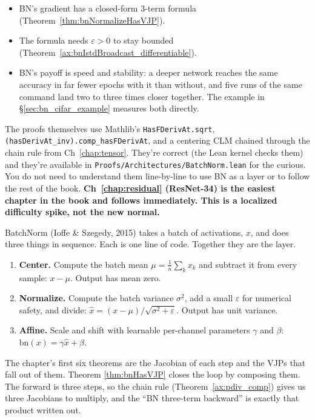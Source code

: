 \begin{itemize}
\item BN's gradient has a closed-form 3-term formula
  (Theorem~\ref{thm:bnNormalizeHasVJP}).
\item The formula needs \(\varepsilon > 0\) to stay bounded
  (Theorem~\ref{ax:bnIstdBroadcast_differentiable}).
\item BN's payoff is speed and stability: a deeper
  network reaches the same accuracy in far fewer epochs with it than
  without, and five runs of the same command land two to three times
  closer together. The example in
  \S\ref{sec:bn_cifar_example} measures both directly.
\end{itemize}

The proofs themselves use Mathlib's \texttt{HasFDerivAt.sqrt},
\texttt{(hasDerivAt\_inv).comp\_hasFDerivAt}, and a centering CLM
chained through the chain rule from Ch~\ref{chap:tensor}. They're
correct (the Lean kernel checks them) and they're available in
\texttt{Proofs/Architectures/BatchNorm.lean} for the curious. You do not need to
understand them line-by-line to use BN as a layer or to follow the
rest of the book. \textbf{Ch~\ref{chap:residual} (ResNet-34) is
the easiest chapter in the book and follows immediately. This
is a localized difficulty spike, not the new normal.}


BatchNorm (Ioffe \& Szegedy, 2015) takes a batch of activations,
\(x\), and does three things in sequence. Each is one line of code.
Together they are the layer.

\begin{enumerate}
\item \textbf{Center.} Compute the batch mean
  \(\mu = \frac{1}{n} \sum_k x_k\) and subtract it from every sample:
  \(x - \mu\). Output has mean zero.
\item \textbf{Normalize.} Compute the batch variance \(\sigma^2\),
  add a small \(\varepsilon\) for numerical safety, and divide:
  \(\hat{x} = (x - \mu)/\sqrt{\sigma^2 + \varepsilon}\). Output has
  unit variance.
\item \textbf{Affine.} Scale and shift with learnable per-channel
  parameters \(\gamma\) and \(\beta\): \(\mathrm{bn}(x) = \gamma \hat{x} + \beta\).
\end{enumerate}

The chapter's first six theorems are the Jacobian of each step
and the VJPs that fall out of them. Theorem
\ref{thm:bnHasVJP} closes the loop by composing them. The
forward is three steps, so the chain rule (Theorem~\ref{ax:pdiv_comp}) gives us three
Jacobians to multiply,
and the ``BN three-term backward'' is exactly that
product written out.

